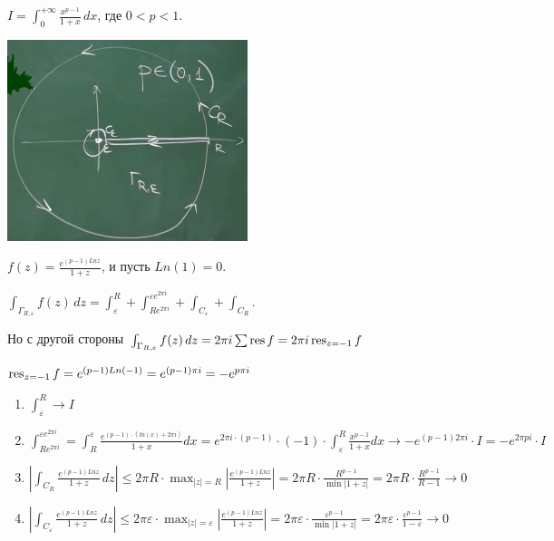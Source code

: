\newpage

\begin{example}
    $I = \int_{0}^{+\infty} \frac{x^{p - 1}}{1 + x} \, dx $, где $0 < p < 1$.

    \begin{center}
        \includegraphics[width=7cm]{assets/04-functions-of-complex-variables/example-2-principal-value-integral.png}
    \end{center}

    $f(z) = \frac{e^{(p - 1) Ln z}}{1 + z}$, и пусть $Ln (1) = 0$.

    $\int_{\Gamma_{R, \varepsilon}} f(z) \, dz = \int_{\varepsilon}^{R} + \int_{Re^{2\pi i}}^{\varepsilon e^{2\pi i}} + \int_{C_{\varepsilon}} + \int_{C_R}$.

    Но с другой стороны $\int_{\Gamma_{R, \varepsilon}} f(z) \, dz = 2 \pi i \sum \operatorname{res} f = 2 \pi i \operatorname{res}_{z = -1} f$

    $\operatorname{res}_{z = -1} f = e^{(p - 1) Ln (-1)} = e^{(p - 1)\pi i} = -e^{p \pi i}$

    \begin{enumerate}
        \item {
            $\int_{\varepsilon}^{R} \rightarrow I$
        }
        \item {
            $\int_{Re^{2\pi i}}^{\varepsilon e^{2 \pi i}} = \int_{R}^{\varepsilon} \frac{e^{(p-1)\cdot (ln(x) + 2\pi i)}}{1 + x}dx = e^{2\pi i \cdot (p-1)} \cdot (-1)\cdot \int_{\varepsilon}^{R} \frac{x^{p - 1}}{1 + x} dx \rightarrow -e^{(p - 1) 2 \pi i} \cdot I = -e^{2\pi p i} \cdot I$
        }
        \item {
            $\left | \int_{C_{R}} \frac{e^{(p - 1)Ln z}}{1 + z} \, dz \right | \leqslant 2\pi R \cdot \max_{|z| = R} \left | \frac{e^{(p - 1) Ln z}}{1 + z} \right | =
            2\pi R \cdot \frac{R^{p - 1}}{\min |1 + z|} = 2\pi R \cdot \frac{R^{p - 1}}{R - 1} \rightarrow 0$

        }
        \item {
            $\left | \int_{C_{\varepsilon}} \frac{e^{(p - 1)Ln z}}{1 + z} \, dz \right | \leqslant 2\pi \varepsilon \cdot \max_{|z| = \varepsilon} \left | \frac{e^{(p - 1) Ln z}}{1 + z} \right | =
            2\pi \varepsilon \cdot \frac{\varepsilon^{p - 1}}{\min |1 + z|} = 2\pi \varepsilon \cdot \frac{\varepsilon^{p - 1}}{1 - \varepsilon} \rightarrow 0$
        }


\end{enumerate}
\end{example}
